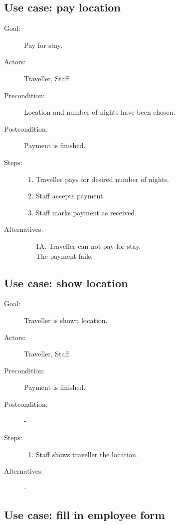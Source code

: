 \subsection{Use case: pay location}

\begin{description}
\item[Goal:] Pay for stay.
\item[Actors:] Traveller, Staff.
\item[Precondition:] Location and number of nights have been chosen.
\item[Postcondition:] Payment is finished.
\item[Steps:]
\begin{enumerate}
\item Traveller pays for desired number of nights.
\item Staff accepts payment.
\item Staff marks payment as received.
\end{enumerate}

\item[Alternatives:]
\begin{enumerate}
\item[1A.] Traveller can not pay for stay.\\
The payment fails.
\end{enumerate}
\end{description}

\subsection{Use case: show location}

\begin{description}
\item[Goal:] Traveller is shown location.
\item[Actors:] Traveller, Staff.
\item[Precondition:] Payment is finished.
\item[Postcondition:] -
\item[Steps:] 
\begin{enumerate}
\item Staff shows traveller the location.
\end{enumerate}

\item[Alternatives:] -
\end{description}

\subsection{Use case: fill in employee form}

